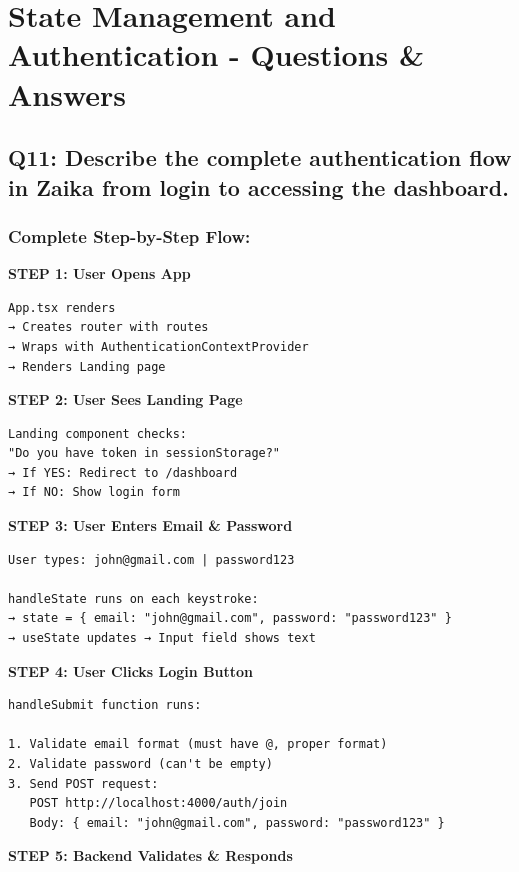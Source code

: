 \documentclass[12pt]{article}
\begin{document}
\section{State Management and Authentication - Questions \& Answers}

\subsection{Q11: Describe the complete authentication flow in Zaika from login to accessing the dashboard.}

\subsubsection*{Complete Step-by-Step Flow:}

\textbf{STEP 1: User Opens App}

\begin{lstlisting}
App.tsx renders
→ Creates router with routes
→ Wraps with AuthenticationContextProvider
→ Renders Landing page
\end{lstlisting}

\textbf{STEP 2: User Sees Landing Page}

\begin{lstlisting}
Landing component checks:
"Do you have token in sessionStorage?"
→ If YES: Redirect to /dashboard
→ If NO: Show login form
\end{lstlisting}

\textbf{STEP 3: User Enters Email \& Password}

\begin{lstlisting}
User types: john@gmail.com | password123

handleState runs on each keystroke:
→ state = { email: "john@gmail.com", password: "password123" }
→ useState updates → Input field shows text
\end{lstlisting}

\textbf{STEP 4: User Clicks Login Button}

\begin{lstlisting}
handleSubmit function runs:

1. Validate email format (must have @, proper format)
2. Validate password (can't be empty)
3. Send POST request:
   POST http://localhost:4000/auth/join
   Body: { email: "john@gmail.com", password: "password123" }
\end{lstlisting}

\textbf{STEP 5: Backend Validates \& Responds}
\end{document}
